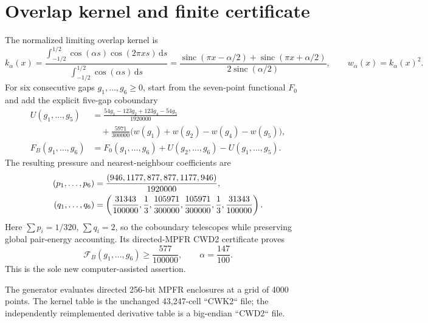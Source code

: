 \documentclass[11pt]{article}
\newcommand{\sinc}{\operatorname{sinc}}
\newcommand{\dd}{\,\mathrm{d}}
\begin{document}
\section{Overlap kernel and finite certificate}
\label{sec:certificate}
The normalized limiting overlap kernel is
\begin{equation}
 k_\alpha(x)=
 \frac{\displaystyle\int_{-1/2}^{1/2}\cos(\alpha s)\cos(2\pi xs)\dd s}
 {\displaystyle\int_{-1/2}^{1/2}\cos(\alpha s)\dd s}
 =\frac{\sinc(\pi x-\alpha/2)+\sinc(\pi x+\alpha/2)}
 {2\sinc(\alpha/2)},
 \qquad w_\alpha(x)=k_\alpha(x)^2.
 \label{eq:kernel}
\end{equation}
For six consecutive gaps $g_1,\ldots,g_6\ge0$, start from the seven-point
functional $F_0$ and add the explicit five-gap coboundary
\begin{align}
 U(g_1,\ldots,g_5)&=\frac{54g_1-123g_2+123g_4-54g_5}{1920000}\\
 &\quad+\frac{5971}{300000}\bigl(w(g_1)+w(g_2)-w(g_4)-w(g_5)\bigr),\\
 F_B(g_1,\ldots,g_6)&=F_0(g_1,\ldots,g_6)+U(g_2,\ldots,g_6)-U(g_1,\ldots,g_5).
 \label{eq:coboundary}
\end{align}
The resulting pressure and nearest-neighbour coefficients are
\begin{align}
 (p_1,\ldots,p_6)
 &=\frac{(946,1177,877,877,1177,946)}{1920000},\notag\\
 (q_1,\ldots,q_6)
 &=\left(\frac{31343}{100000},\frac13,\frac{105971}{300000},
 \frac{105971}{300000},\frac13,\frac{31343}{100000}\right).
 \label{eq:pq}
\end{align}
Here $\sum p_i=1/320$, $\sum q_i=2$, so the coboundary telescopes while
preserving global pair-energy accounting.  Its directed-MPFR CWD2 certificate
proves
\begin{equation}
 \mathcal F_B(g_1,\ldots,g_6)\ge\frac{577}{100000},
 \qquad \alpha=\frac{147}{100}.
 \label{eq:fb}
\end{equation}
This is the sole new computer-assisted assertion.

The generator evaluates directed 256-bit MPFR enclosures at a grid of 4000
points.  The kernel table is the unchanged 43,247-cell ``CWK2`` file; the
independently reimplemented derivative table is a big-endian ``CWD2`` file.
\end{document}
